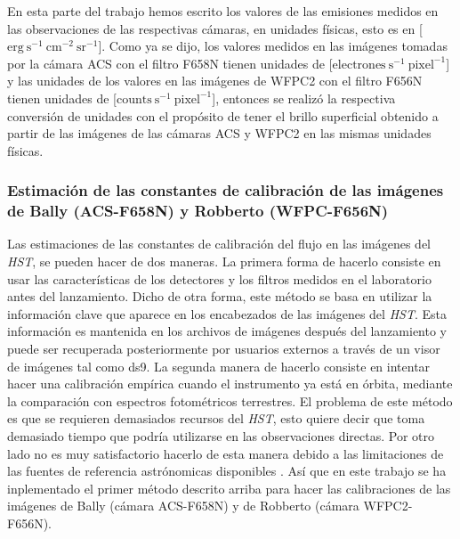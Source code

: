 \label{sec:const}
En esta parte del trabajo hemos escrito los valores de las emisiones medidos en las observaciones de las respectivas cámaras, en unidades físicas, esto es en [\(\mathrm{erg\ s^{-1}\ cm^{-2}\ sr^{-1}}\)]. Como ya se dijo, los valores medidos en las imágenes tomadas por la cámara ACS con el filtro F658N tienen unidades de [\(\mathrm{electrones\ s^{-1}}~\text{pixel}^{-1}\)] y las unidades de los valores en las imágenes de WFPC2 con el filtro F656N tienen unidades de [\(\text{counts}\ \text{s}^{-1}~\text{pixel}^{-1}\)], entonces se realizó la respectiva conversión de unidades con el propósito de tener el brillo superficial obtenido a partir de las imágenes de las cámaras ACS y WFPC2 en las mismas unidades físicas.\\

\subsubsection{Estimación de las constantes de calibración de las imágenes de Bally (ACS-F658N) y Robberto (WFPC-F656N)}
\label{sec:acs}

Las estimaciones de las constantes de calibración del flujo en las imágenes del \textit{HST}, se pueden hacer de dos maneras. La primera forma de hacerlo consiste en usar las características de los detectores y los filtros medidos en el laboratorio antes del lanzamiento. Dicho de otra forma, este método se basa en utilizar la información clave que aparece en los encabezados de las imágenes del \textit{HST}. Esta información es mantenida en los archivos de imágenes después del lanzamiento y puede ser recuperada posteriormente por usuarios externos a través de un visor de imágenes tal como ds9. La segunda manera de hacerlo consiste en intentar hacer una calibración empírica cuando el instrumento ya está en órbita, mediante la comparación con espectros fotométricos terrestres. El problema de este método es que se requieren demasiados recursos del \textit{HST}, esto quiere decir que toma demasiado tiempo que podría utilizarse en las observaciones directas. Por otro lado no es muy satisfactorio hacerlo de esta manera debido a las limitaciones de las fuentes de referencia astrónomicas disponibles \citep{McMaster:2008}. Así que en este trabajo se ha inplementado el primer método descrito arriba para hacer las calibraciones de las imágenes de Bally (cámara ACS-F658N) y de Robberto (cámara WFPC2-F656N).\\     

